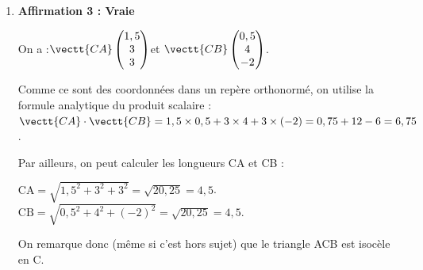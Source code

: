 \begin{enumerate}
\begin{enumerate}
			$\begin{aligned}
				\begin{cases}
					3-s = t\\
					s = -1,5 - t\\
					2 -5s = 2 - 2t
				\end{cases}
				&\iff \begin{cases}
					3-s = t\\
					s = -1,5 - (3 - s)\\
					2 -5s = 2 - 2(3 - s)
				\end{cases}\\
				&\iff \begin{cases}
					3-s = t\\
					s = -1,5 - 3 + s\\
					2 -5s = 2 - 6 + 2s
				\end{cases}\\
			\end{aligned} $

			Les équations du système sont incompatibles (la deuxième équation est équivaut à $0 = -4,5$).

			Le système n'a pas de solution.

			Il n'y a donc aucun point commun entre les droites (AB) et $(d)$, qui sont donc non coplanaires, et pas sécantes.

			\item \textbf{Affirmation 3 : Vraie}

			On a :\quad $\vectt{CA} \begin{pmatrix} 1,5\\3\\3 \end{pmatrix} $\quad et \quad $\vectt{CB} \begin{pmatrix} 0,5\\4\\-2 \end{pmatrix} $.

			Comme ce sont des coordonnées dans un repère orthonormé, on utilise la formule analytique du produit scalaire :\quad $\vectt{CA}\cdot\vectt{CB} = 1,5 \times 0,5 + 3 \times 4 + 3 \times (-2) = 0,75 + 12 - 6 = 6,75$.

			Par ailleurs, on peut calculer les longueurs CA et CB :

			$\mathrm{CA} = \sqrt{1,5^2 + 3^2 + 3^2} = \sqrt{20,25} = 4,5$.\quad $\mathrm{CB} = \sqrt{0,5^2 + 4^2 + (-2)^2} = \sqrt{20,25} = 4,5$.

			On remarque donc (même si c'est hors sujet) que le triangle ACB est isocèle en C.


\end{enumerate}
\end{enumerate}
